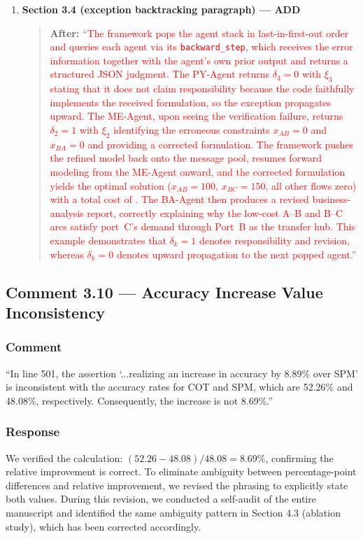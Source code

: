 \documentclass[11pt,a4paper]{article}
\begin{document}
\begin{enumerate}
\item \textbf{Section 3.4 (exception backtracking paragraph) --- ADD}
\begin{quote}
\textbf{After:} ``\textcolor{red}{The framework pops the agent stack in last-in-first-out order and queries each agent via its \texttt{backward\_step}, which receives the error information together with the agent's own prior output and returns a structured JSON judgment. The PY-Agent returns $\delta_3{=}0$ with $\xi_3$ stating that it does not claim responsibility because the code faithfully implements the received formulation, so the exception propagates upward. The ME-Agent, upon seeing the verification failure, returns $\delta_2{=}1$ with $\xi_2$ identifying the erroneous constraints $x_{AB}{=}0$ and $x_{BA}{=}0$ and providing a corrected formulation. The framework pushes the refined model back onto the message pool, resumes forward modeling from the ME-Agent onward, and the corrected formulation yields the optimal solution ($x_{AB}{=}100$, $x_{BC}{=}150$, all other flows zero) with a total cost of . The BA-Agent then produces a revised business-analysis report, correctly explaining why the low-cost A--B and B--C arcs satisfy port~C's demand through Port~B as the transfer hub. This example demonstrates that $\delta_k=1$ denotes responsibility and revision, whereas $\delta_k=0$ denotes upward propagation to the next popped agent.}''
\end{quote}
\end{enumerate}

\subsection{Comment 3.10 --- Accuracy Increase Value Inconsistency}

\subsubsection{Comment}
``In line 501, the assertion `...realizing an increase in accuracy by 8.89\% over SPM' is inconsistent with the accuracy rates for COT and SPM, which are 52.26\% and 48.08\%, respectively. Consequently, the increase is not 8.69\%.''

\subsubsection{Response}
We verified the calculation: $(52.26-48.08)/48.08 = 8.69\%$, confirming the relative improvement is correct. To eliminate ambiguity between percentage-point differences and relative improvement, we revised the phrasing to explicitly state both values. During this revision, we conducted a self-audit of the entire manuscript and identified the same ambiguity pattern in Section 4.3 (ablation study), which has been corrected accordingly.
\end{document}
